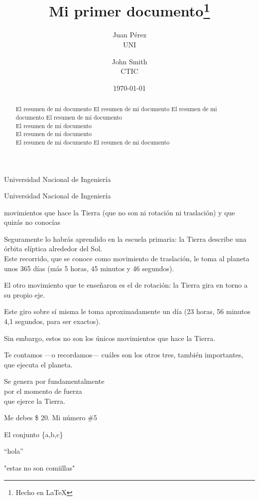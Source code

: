 \documentclass[12pt,a4paer]{article}
\title{Mi primer documento\thanks{Hecho en \LaTeX}}
\author{Juan Pérez\\UNI\and John Smith\\CTIC}%
\date{\today}
\begin{document}
\maketitle

\begin{abstract}
El resumen de mi documento
El resumen de mi documento
El resumen de mi documento
El resumen de mi documento\\
El resumen de mi documento\\
El resumen de mi documento\\
El resumen de mi documento
El resumen de mi documento
\end{abstract}
\begin{center}
	Universidad Nacional de Ingeniería
\end{center}
\centerline{
Universidad Nacional de Ingeniería
}
 movimientos que hace la Tierra (que no son ni rotación ni traslación) 
y que quizás no conocías

Seguramente lo habrás aprendido en la escuela primaria: la Tierra describe una órbita elíptica alrededor del Sol.\\[2cm]

Este recorrido, que se conoce como movimiento de traslación, le toma al planeta unos 365 días 
(más 5 horas, 45 minutos y 46 segundos).

El otro movimiento que te enseñaron es el de rotación: la Tierra gira en torno a su propio eje.

Este giro sobre sí misma le toma aproximadamente un día (23 horas, 56 minutos 4,1 segundos, para ser exactos). 

Sin embargo, estos no son los únicos movimientos que hace la Tierra.

Te contamos —o recordamos— cuáles son los otros tres, también importantes, que ejecuta el planeta.

\enlargethispage*{15mm} %

\begin{flushright}
Se genera por fundamentalmente\\ por el momento de fuerza\\ que ejerce la Tierra.
\end{flushright}

Me debes \$ 20. Mi número \#5

El conjunto \{a,b,c\}

``hola''


"estas no son comiillas"
\end{document}
